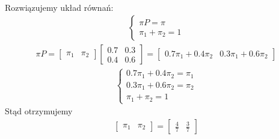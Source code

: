 \documentclass[main.tex]{subfiles}
\begin{document}
\begin{enumerate}
\begin{align*}
        \end{align*}
        Rozwiązujemy układ równań:
        \begin{align*}
            \left\{\begin{matrix}
                       \pi P = \pi\\
                       \pi_1 + \pi_2 = 1
            \end{matrix}\right.
        \end{align*}
        \begin{align*}
            \pi P =
            \begin{bmatrix}
                \pi_1 & \pi_2
            \end{bmatrix}
            \begin{bmatrix}
                0.7 & 0.3\\
                0.4 & 0.6
            \end{bmatrix}
            =
            \begin{bmatrix}
                0.7\pi_1 + 0.4\pi_2 & 0.3\pi_1 + 0.6\pi_2
            \end{bmatrix}
        \end{align*}
        \begin{align*}
            \left\{\begin{matrix}
                       0.7\pi_1 + 0.4\pi_2 = \pi_1\\
                       0.3\pi_1 + 0.6\pi_2 = \pi_2\\
                       \pi_1 + \pi_2 = 1
            \end{matrix}\right.
        \end{align*}
        Stąd otrzymujemy
        \begin{align*}
            \begin{bmatrix}
                \pi_1 & \pi_2
            \end{bmatrix}
            =
            \begin{bmatrix}
                \frac{4}{7} & \frac{3}{7}
            \end{bmatrix}
        \end{align*}
    \end{enumerate}
    \newpage
\end{document}
